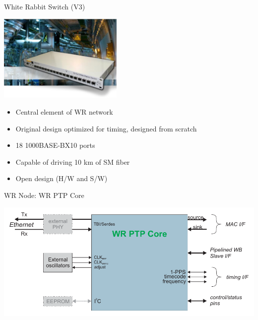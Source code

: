 \documentclass[compress,red]{beamer}
\begin{document}
\begin{frame}{White Rabbit Switch (V3)}

    \begin{center}
    \includegraphics[width=6.0cm]{switch/wrSwitchV3.jpg}
    \end{center}

	\begin{itemize}
	\item Central element of WR network
	\item Original design optimized for timing, designed from scratch
	\item 18 1000BASE-BX10 ports
	\item Capable of driving 10 km of SM fiber
	\item Open design (H/W and S/W)
	\end{itemize}

\end{frame}
\begin{frame}{WR Node: WR PTP Core}

    \begin{center}
    \includegraphics[width=1.0\textwidth]{node/wrpc_box.pdf}
    \end{center}

\end{frame}
\end{document}
